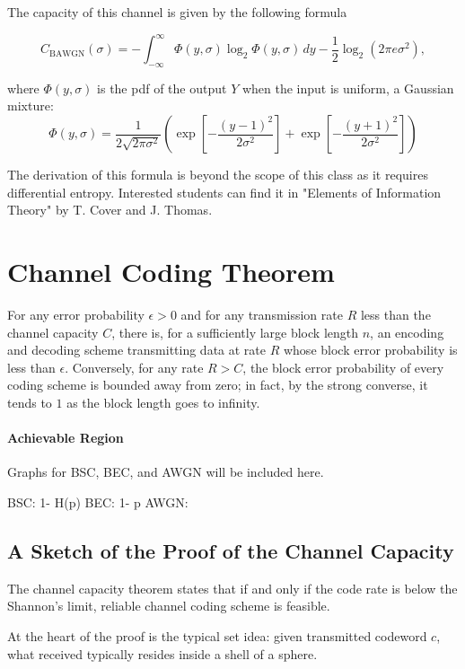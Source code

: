 The capacity of this channel is given by the following formula

\[C_{\mathrm{BAWGN}}(\sigma) = - \int_{-\infty}^{\infty} \Phi(y, \sigma) \log_2 \Phi(y, \sigma)\, dy - \frac{1}{2} \log_2 (2\pi e \sigma^2), \]

where \(\Phi(y, \sigma)\) is the pdf of the output \(Y\) when the input is uniform, a Gaussian mixture: 
\[\Phi(y, \sigma) = \frac{1}{2\sqrt{2\pi \sigma^2}} (\exp[-\frac{(y-1)^2}{2\sigma^2}] + \exp[-\frac{(y+1)^2}{2\sigma^2}]) \]

The derivation of this formula is beyond the scope of this class as it requires differential entropy. Interested students can find it in "Elements of Information Theory" by T. Cover and J. Thomas. 
\section{Channel Coding Theorem}\label{sec:coding_thm}
\begin{theorem}\label{thm:coding}
For any error probability \(\epsilon > 0\) and for any transmission rate \(R\) less than the channel capacity \(C\), there is, for a sufficiently large block length \(n\), an encoding and decoding scheme transmitting data at rate \(R\) whose block error probability is less than \(\epsilon\). Conversely, for any rate \(R > C\), the block error probability of every coding scheme is bounded away from zero; in fact, by the strong converse, it tends to \(1\) as the block length goes to infinity.
\end{theorem}

\paragraph{Achievable Region}
Graphs for BSC, BEC, and AWGN will be included here. 

BSC: 1- H(p)
BEC: 1- p
AWGN: 

\subsection{A Sketch of the Proof of the Channel Capacity}
The channel capacity theorem states that if and only if the code rate is below the Shannon's limit, reliable channel coding scheme is feasible.  

At the heart of the proof is the typical set idea: given transmitted codeword \(c\), what received typically resides inside a shell of a sphere.

